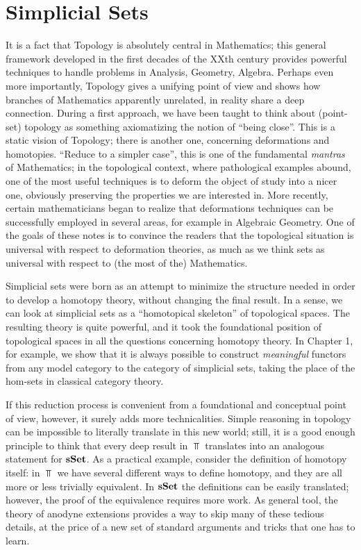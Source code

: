 \chapter{Simplicial Sets}

\begin{refsection}

It is a fact that Topology is absolutely central in Mathematics; this general framework developed in the first decades of the XXth century provides powerful techniques to handle problems in Analysis, Geometry, Algebra. Perhaps even more importantly, Topology gives a unifying point of view and shows how branches of Mathematics apparently unrelated, in reality share a deep connection. During a first approach, we have been taught to think about (point-set) topology as something axiomatizing the notion of ``being close''. This is a static vision of Topology; there is another one, concerning deformations and homotopies. ``Reduce to a simpler case'', this is one of the fundamental \emph{mantras} of Mathematics; in the topological context, where pathological examples abound, one of the most useful techniques is to deform the object of study into a nicer one, obviously preserving the properties we are interested in. More recently, certain mathematicians began to realize that deformations techniques can be successfully employed in several areas, for example in Algebraic Geometry. One of the goals of these notes is to convince the readers that the topological situation is universal with respect to deformation theories, as much as we think sets as universal with respect to (the most of the) Mathematics.

Simplicial sets were born as an attempt to minimize the structure needed in order to develop a homotopy theory, without changing the final result. In a sense, we can look at simplicial sets as a ``homotopical skeleton'' of topological spaces. The resulting theory is quite powerful, and it took the foundational position of topological spaces in all the questions concerning homotopy theory. In Chapter 1, for example, we show that it is always possible to construct \emph{meaningful} functors from any model category to the category of simplicial sets, taking the place of the hom-sets in classical category theory.

If this reduction process is convenient from a foundational and conceptual point of view, however, it surely adds more technicalities. Simple reasoning in topology can be impossible to literally translate in this new world; still, it is a good enough principle to think that every deep result in $\Top$ translates into an analogous statement for $\mathbf{sSet}$. As a practical example, consider the definition of homotopy itself: in $\Top$ we have several different ways to define homotopy, and they are all more or less trivially equivalent. In $\mathbf{sSet}$ the definitions can be easily translated; however, the proof of the equivalence requires more work. As general tool, the theory of anodyne extensions provides a way to skip many of these tedious details, at the price of a new set of standard arguments and tricks that one has to learn.


\end{refsection}
